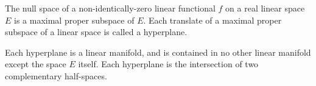 The null space of a non-identically-zero linear functional $f$ on a real linear space $E$ is a maximal proper subspace of $E$. Each translate of a maximal proper subspace of a linear space is called a hyperplane.

Each hyperplane is a linear manifold, and is contained in no other linear manifold except the space $E$ itself. Each hyperplane is the intersection of two complementary half-spaces.
